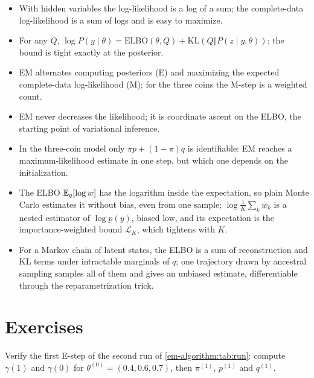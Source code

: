 \begin{notechapter}
\begin{chaptersummary}
\begin{itemize}[nosep]
  \item With hidden variables the log-likelihood is a log of a sum; the
        complete-data log-likelihood is a sum of logs and is easy to maximize.
  \item For any $Q$, $\log P(y\mid\theta) = \mathrm{ELBO}(\theta,Q) + \mathrm{KL}(Q\Vert P(z\mid y,\theta))$;
        the bound is tight exactly at the posterior.
  \item EM alternates computing posteriors (E) and maximizing the expected
        complete-data log-likelihood (M); for the three coins the M-step is a
        weighted count.
  \item EM never decreases the likelihood; it is coordinate ascent on the ELBO,
        the starting point of variational inference.
  \item In the three-coin model only $\pi p + (1-\pi)q$ is identifiable: EM reaches
        a maximum-likelihood estimate in one step, but which one depends on the
        initialization.
  \item The ELBO $\mathbb{E}_q[\log w]$ has the logarithm inside the expectation, so plain
        Monte Carlo estimates it without bias, even from one sample;
        $\log\frac1K\sum_kw_k$ is a nested estimator of $\log p(y)$, biased low, and its
        expectation is the importance-weighted bound $\mathcal L_K$, which tightens with $K$.
  \item For a Markov chain of latent states, the ELBO is a sum of reconstruction
        and KL terms under intractable marginals of $q$; one trajectory drawn by
        ancestral sampling samples all of them and gives an unbiased estimate,
        differentiable through the reparametrization trick.
\end{itemize}
\end{chaptersummary}

\section*{Exercises}

\begin{exercise}\label{em-algorithm:exr:1}
Verify the first E-step of the second run of \cref{em-algorithm:tab:run}: compute
$\gamma(1)$ and $\gamma(0)$ for $\theta^{(0)} = (0.4, 0.6, 0.7)$, then $\pi^{(1)}$, $p^{(1)}$
and $q^{(1)}$.
\end{exercise}


\end{notechapter}
